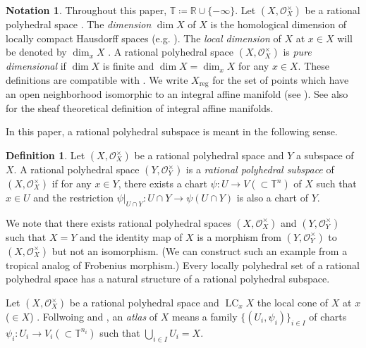 \documentclass[a4paper,dvipdfmx,reqno,12pt]{amsart}
\theoremstyle{definition}
\newtheorem{definition}[theorem]{Definition}
\newtheorem{notation}[theorem]{Notation}
\newcommand{\deq}{\coloneqq}
\newcommand{\opn}[1]{\operatorname{#1}}
\numberwithin{equation}{section}
\begin{document}
\begin{notation}
Throughout this paper, $\mathbb{T}\deq 
\mathbb{R}\cup\{-\infty\}$.
Let $(X,\mathcal{O}_X^{\times})$ be a rational
polyhedral space \cite[Definition 2.2]{MR4246795}.
The \emph{dimension} $\dim X$ of $X$ is 
the homological dimension of locally compact
Hausdorff spaces (e.g.
\cite[Chapter III. Definition 9.4]{MR842190}).
The \emph{local dimension} of $X$ at $x\in X$
will be denoted by $\dim_x X$
\cite[Chapter III. Definition 9.10]{MR842190}.
A rational polyhedral space $(X,\mathcal{O}_X^{\times})$
is \emph{pure dimensional} if $\dim X$ is finite and
$\dim X=\dim_x X$ for any $x\in X$.
These definitions are compatible with
\cite[Definition 7.1.1]{mikhalkin2018tropical}.
We write $X_{\mathrm{reg}}$ for the set of points
which have an open neighborhood isomorphic to an
integral affine manifold
\cite[Definition 2.7]{MR4637248}
(see \cite{MR3894860}).
See also \cite[Definition 3]{MR2181810}
for the sheaf theoretical
definition of integral affine manifolds.
\end{notation}

In this paper, a rational polyhedral subspace is meant
in the following sense.

\begin{definition}
Let 
$(X,\mathcal{O}_X^{\times})$ be a rational polyhedral space
and $Y$ a subspace of $X$.
A rational polyhedral space $(Y,\mathcal{O}_Y^{\times})$ is 
a \emph{rational polyhedral subspace} of
$(X,\mathcal{O}_X^{\times})$ if 
for any $x\in Y$, there exists a chart
$\psi \colon U \to V (\subset \mathbb{T}^{n})$
of $X$
such that $x\in U$ and the restriction
$\psi|_{U\cap Y}\colon U\cap Y\to 
\psi(U\cap Y)$ is also a chart of $Y$.
\end{definition}
We note that there exists rational polyhedral spaces
$(X,\mathcal{O}_X^{\times})$
and $(Y,\mathcal{O}_Y^{\times})$
such that $X=Y$ and the identity map of $X$ 
is a morphism from $(Y,\mathcal{O}_Y^{\times})$ to
$(X,\mathcal{O}_X^{\times})$ but not an isomorphism.
(We can construct such an example from a tropical analog of
Frobenius morphism.)
Every locally polyhedral set of a rational polyhedral space
\cite[Definition 2.4 (d)]{MR4637248} has a natural 
structure of a rational polyhedral subspace.

Let $(X,\mathcal{O}_X^{\times})$ be a rational polyhedral space
and $\opn{LC}_x X$ the local cone of $X$ at $x$ ($\in X$)
\cite[]{MR4637248}.
Follwoing \cite[Definition 7.1.8]{mikhalkin2018tropical} and 
\cite[Definition 2.3]{demedrano2023chern},
an \emph{atlas} of $X$ means a family 
$\{(U_i,\psi_i)\}_{i\in I}$ of charts 
$\psi_i\colon U_i\to V_i (\subset \mathbb{T}^{n_i})$
\cite[Definition 2.2]{MR4637248}
such that $\bigcup_{i\in I}U_i=X$.
\end{document}

